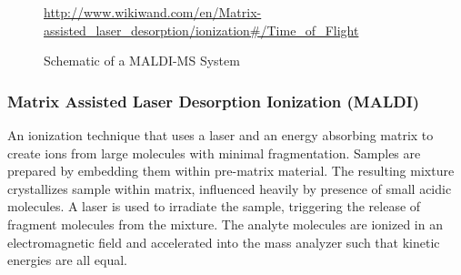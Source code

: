\documentclass[letterpaper, 10 pt, conference]{ieeeconf}  %
\begin{document}
        \begin{figure}[h]
            \centering
        
            \caption{Schematic of a MALDI-MS System}

            \tiny{\url{http://www.wikiwand.com/en/Matrix-assisted_laser_desorption/ionization#/Time_of_Flight}}

        \end{figure}

            \subsubsection[\textbf{Matrix Assisted Laser Desorption}]{\textbf{Matrix Assisted Laser Desorption Ionization (MALDI)}} \hfill \hfill
        
            An ionization technique that uses a laser and an energy absorbing matrix to create ions from large molecules with minimal fragmentation. Samples are prepared by embedding them within pre-matrix material. The resulting mixture crystallizes sample within matrix, influenced heavily by presence of small acidic molecules. A laser is used to irradiate the sample, triggering the release of fragment molecules from the mixture. The analyte molecules are ionized in an electromagnetic field and accelerated into the mass analyzer such that kinetic energies are all equal.\autocite{R1}
\end{document}
